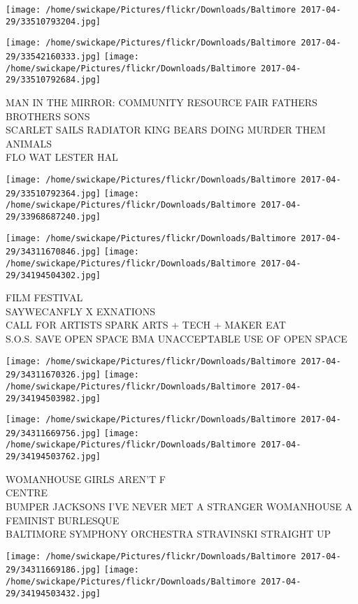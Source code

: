 \documentclass[10pt,letterpaper]{article}
\begin{document}
\texttt{[image: /home/swickape/Pictures/flickr/Downloads/Baltimore 2017-04-29/33510793204.jpg]}

\vspace{0.25in}
\texttt{[image: /home/swickape/Pictures/flickr/Downloads/Baltimore 2017-04-29/33542160333.jpg]}
\texttt{[image: /home/swickape/Pictures/flickr/Downloads/Baltimore 2017-04-29/33510792684.jpg]}

MAN IN THE MIRROR: COMMUNITY RESOURCE FAIR FATHERS BROTHERS SONS\\
SCARLET SAILS RADIATOR KING BEARS DOING MURDER THEM ANIMALS\\
FLO WAT LESTER HAL
\pagebreak

\texttt{[image: /home/swickape/Pictures/flickr/Downloads/Baltimore 2017-04-29/33510792364.jpg]}
\texttt{[image: /home/swickape/Pictures/flickr/Downloads/Baltimore 2017-04-29/33968687240.jpg]}

\texttt{[image: /home/swickape/Pictures/flickr/Downloads/Baltimore 2017-04-29/34311670846.jpg]}
\texttt{[image: /home/swickape/Pictures/flickr/Downloads/Baltimore 2017-04-29/34194504302.jpg]}

FILM FESTIVAL\\
SAYWECANFLY X EXNATIONS\\
CALL FOR ARTISTS SPARK ARTS + TECH + MAKER EAT\\
S.O.S. SAVE OPEN SPACE BMA UNACCEPTABLE USE OF OPEN SPACE
\pagebreak

\texttt{[image: /home/swickape/Pictures/flickr/Downloads/Baltimore 2017-04-29/34311670326.jpg]}
\texttt{[image: /home/swickape/Pictures/flickr/Downloads/Baltimore 2017-04-29/34194503982.jpg]}

\texttt{[image: /home/swickape/Pictures/flickr/Downloads/Baltimore 2017-04-29/34311669756.jpg]}
\texttt{[image: /home/swickape/Pictures/flickr/Downloads/Baltimore 2017-04-29/34194503762.jpg]}

WOMANHOUSE GIRLS AREN'T F\\
CENTRE\\
BUMPER JACKSONS I'VE NEVER MET A STRANGER WOMANHOUSE A FEMINIST BURLESQUE\\
BALTIMORE SYMPHONY ORCHESTRA STRAVINSKI STRAIGHT UP
\pagebreak

\texttt{[image: /home/swickape/Pictures/flickr/Downloads/Baltimore 2017-04-29/34311669186.jpg]}
\texttt{[image: /home/swickape/Pictures/flickr/Downloads/Baltimore 2017-04-29/34194503432.jpg]}
\end{document}
